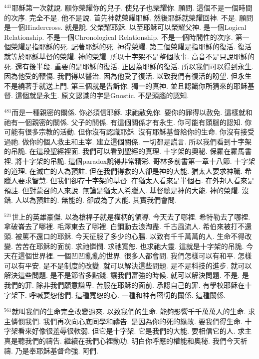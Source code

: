 \documentclass{book}
\begin{document}
$^{441}$耶穌第一次就說.
願你榮耀你的兒子.
使兒子也榮耀你.
願問.
這個不是一個時間的次序.
完全不是.
他不是說.
首先神就榮耀耶穌.
然後耶穌就榮耀回神.
不是.
願問是一個Hindercross.
就是說.
父榮耀耶穌.
以至耶穌可以榮耀父神.
是一個Logical Relationship.
不是一個Chronological Relationship.
不是一個時間性的次序.
第一個榮耀是指耶穌的死.
記著耶穌的死.
神得榮耀.
第二個榮耀是指耶穌的復活.
復活就等於耶穌基督的榮耀.
神的榮耀.
所以十字架不是整個故事.
高音不是只說耶穌的死.
還有後半段.
重要的是耶穌的復活.
正因為耶穌的復活.
所以我們可以得到永生.
因為他受的鞭傷.
我們得以醫治.
因為他受了復活.
以致我們有復活的盼望.
但永生不是繞著手就送上門.
第三個就是告訴你.
獨一的真神.
並且認識你所猜來的耶穌基督.
這個就是永生.
原文認識的字是Gnostic.
不是頭腦的認知.

$^{481}$而是一種親密的關係.
你必須信耶穌.
求祂赦免你.
要你的罪得以赦免.
這樣就和祂有一個親密的關係.
父子的關係.
有這個關係才有永生.
你可能有頭腦的認知.
你可能有很多宗教的活動.
但你沒有認識耶穌.
沒有耶穌基督給你的生命.
你沒有接受過祂.
做你的個人救主和主宰.
建立這個關係.
一切都是謊言.
所以我們看到十字架的吊詭.
在這段聖經裡面.
我們可以看到聖經的真理.
十字架的奧秘.
保羅在羅馬書裡.
將十字架的吊詭.
這個paradox說得非常精彩.
哥林多前書第一章十八節.
十字架的道理.
在滅亡的人為預註.
但在我們得救的人卻是神的大能.
猶太人要求神職.
希臘人要求智慧.
但我們卻存十字架的基督.
在猶太人看來是半個石.
在外邦人看來是預註.
但對蒙召的人來說.
無論是猶太人希臘人.
基督總是神的大能.
神的榮耀.
沒錯.
人以為預註的.
無能的.
卻成為了大能.
其實我們會問.

$^{521}$世上的英雄豪傑.
以為槍桿子就是權柄的領導.
今天去了哪裡.
希特勒去了哪裡.
拿破崙去了哪裡.
毛澤東去了哪裡.
白鋼動去浪淘盡.
千古風流人.
希伯來被打不還頭.
被罵不還口的耶穌.
今天征服了多少的心腸.
以致有千千萬萬的人.
生命不得改變.
苦苦在耶穌的面前.
求祂憐憫.
求祂寬恕.
也求祂大靈.
這就是十字架的吊詭.
今天在這個世界裡.
一個凹凹亂亂的世界.
很多人都會問.
我們怎樣可以有和平.
怎樣可以有平安.
是不是制度的改變.
就可以解決這些問題.
是不是科技的進步.
就可以解決這些問題.
是不是節省多點錢.
讓我們富強的時候.
就可以解決問題.
不是.
是我們的罪.
除非我們願意謙卑.
苦服在耶穌的面前.
承認自己的罪.
有學校耶穌在十字架下.
呼喊要恕他們.
這種寬恕的心.
一種和神有密切的關係.
這種關係.

$^{561}$就叫我們的生命完全改變過來.
以致我們的生命.
能夠影響千千萬萬人的生命.
求主憐憫我們.
我們再次向心底同學和禱告.
是因為你的死的緣故.
要我們得生命.
十字架看來好像很羞辱很軟弱.
但它是十字架.
它是我們的大能.
要相信它的人.
求主真是聽我們的禱告.
繼續在我們心裡動功.
明白你呼應的權能和奧秘.
我們今天祈禱.
乃是奉耶穌基督命強.
阿們.
\newpage
\end{document}

